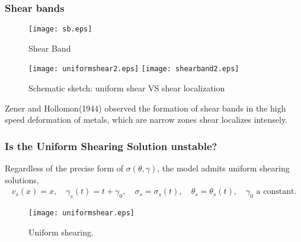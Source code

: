 \documentclass{beamer}
\def\red{\color{red}}
\begin{document}
\begin{frame}
 \frametitle{Shear bands}
 \begin{minipage}{0.3\linewidth}
 \begin{figure}
    \centering
    {
      \texttt{[image: sb.eps]} 
    } 
    \caption{Shear Band}
 \end{figure}
 \end{minipage}
  \hfill
 \begin{minipage}{0.6\linewidth}
 \begin{figure}
      \texttt{[image: uniformshear2.eps]}
     \quad \quad \quad
      \texttt{[image: shearband2.eps]}
    \caption{Schematic sketch: uniform shear VS shear localization}
 \end{figure}
 \end{minipage}
 
 Zener and Hollomon(1944) observed the formation of shear bands in the high speed deformation of metals, which are narrow zones shear localizes intensely.
 \vfill
\end{frame}

\begin{frame}
 \frametitle{Is the Uniform Shearing Solution unstable?}
 Regardless of the precise form of $\sigma(\theta,\gamma)$, the model admits {\red uniform shearing solutions},
 \begin{align*}
  v_s(x) = x, \quad \gamma_s(t) = t + \gamma_0, \quad \sigma_s = \sigma_s(t), \quad \theta_s=\theta_s(t),\quad \text{$\gamma_0$ a constant}.
 \end{align*}
 
  \begin{figure}
    \center
    \texttt{[image: uniformshear.eps]}
    \caption{{\footnotesize Uniform shearing.}}
  \end{figure}
  
\end{frame}
\end{document}
